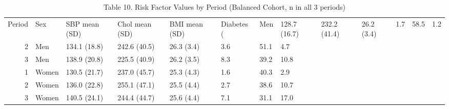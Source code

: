 \begin{table}[ht]
\centering
\caption{Table 10. Risk Factor Values by Period (Balanced Cohort, n in all 3 periods)} 
\begin{tabular}{rlllllll}
  \toprule
Period & Sex & SBP mean (SD) & Chol mean (SD) & BMI mean (SD) & Diabetes (%
   & Men & 128.7 (16.7) & 232.2 (41.4) & 26.2 (3.4) & 1.7 & 58.5 & 1.2 \\ 
     2 & Men & 134.1 (18.8) & 242.6 (40.5) & 26.3 (3.4) & 3.6 & 51.1 & 4.7 \\ 
     3 & Men & 138.9 (20.8) & 225.5 (40.9) & 26.2 (3.5) & 8.3 & 39.2 & 10.8 \\ 
     1 & Women & 130.5 (21.7) & 237.0 (45.7) & 25.3 (4.3) & 1.6 & 40.3 & 2.9 \\ 
     2 & Women & 136.0 (22.8) & 255.1 (47.1) & 25.5 (4.4) & 2.7 & 38.6 & 10.7 \\ 
     3 & Women & 140.5 (24.1) & 244.4 (44.7) & 25.6 (4.4) & 7.1 & 31.1 & 17.0 \\ 
   \bottomrule
\end{tabular}
\end{table}
